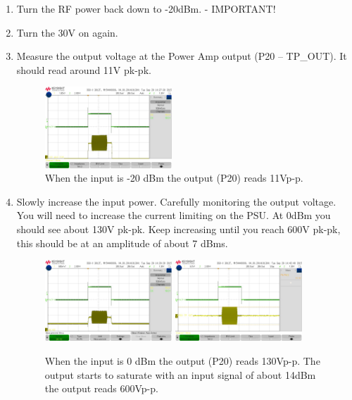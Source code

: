 \begin{enumerate}
\begin{figure}[H]
		\end{figure}
	\item Turn the RF power back down to -20dBm. - IMPORTANT!
	\item Turn the 30V on again.
	\item Measure the output voltage at the Power Amp output (P20 – TP\_OUT). It should read around 11V pk-pk.
		\begin{figure}[H]
			\centering
			\includegraphics[width=0.45\textwidth]{images/hardware/signal_18.jpg}
			\caption{When the input is -20 dBm the output (P20) reads 11Vp-p.}
			\label{fig:hw_amp_signals_4}
		\end{figure}
	\item Slowly increase the input power. Carefully monitoring the output voltage. You will need to increase the current limiting on the PSU. At 0dBm you should see about 130V pk-pk. Keep increasing until you reach 600V pk-pk, this should be at an amplitude of about 7 dBms.
		\begin{figure}[H]
			\centering
			\includegraphics[width=0.45\textwidth]{images/hardware/signal_19.jpg}
			\includegraphics[width=0.45\textwidth]{images/hardware/signal_20.jpg}
			\caption{When the input is 0 dBm the output (P20) reads 130Vp-p. The output starts to saturate with an input signal of about 14dBm the output reads 600Vp-p.}
			\label{fig:hw_amp_signals_5}

\end{figure}
\end{enumerate}
